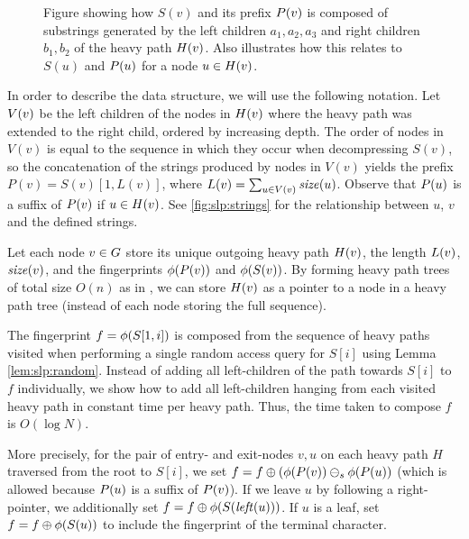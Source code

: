 \begin{figure}[tb]
\begin{center}
\begin{tikzpicture}
\end{tikzpicture}	
	\end{center}
	\caption{Figure showing how $S(v)$ and its prefix $\leftstring(v)$ is composed of substrings generated by the left children $a_1, a_2, a_3$ and right children $b_1, b_2$ of the heavy path $\heavypath(v)$. Also illustrates how this relates to $S(u)$ and $\leftstring(u)$ for a node $u \in \heavypath(v)$.\label{fig:slp:strings}}
\end{figure}

In order to describe the data structure, we will use the following notation. Let $\leftnodes(v)$ be the left children of the nodes in $\heavypath(v)$ where the heavy path was extended to the right child, ordered by increasing depth. The order of nodes in $V(v)$ is equal to the sequence in which they occur when decompressing $S(v)$, so the concatenation of the strings produced by nodes in $V(v)$ yields the prefix $P(v)=S(v)[1,L(v)]$, where $\leftsize(v) = \sum_{u \in \leftnodes(v)} \size(u)$. Observe that $\leftstring(u)$ is a suffix of $\leftstring(v)$ if $u \in \heavypath(v)$. See \autoref{fig:slp:strings} for the relationship between $u$, $v$ and the defined strings.
 
Let each node $v \in \slp$ store its unique outgoing heavy path $\heavypath(v)$, the length $\leftsize(v)$, $\size(v)$, and the fingerprints $\fp(\leftstring(v))$ and $\fp(S(v))$. By forming heavy path trees of total size $O(n)$ as in \cite{bille2011random}, we can store $\heavypath(v)$ as a pointer to a node in a heavy path tree (instead of each node storing the full sequence).

The fingerprint $f = \fp(S[1, i])$ is composed from the sequence of heavy paths visited when performing a single random access query for $S[i]$ using Lemma \ref{lem:slp:random}. Instead of adding all left-children of the path towards $S[i]$ to $f$ individually, we show how to add all left-children hanging from each visited heavy path in constant time per heavy path. Thus, the time taken to compose $f$ is $O(\log N)$. 

More precisely, for the pair of entry- and exit-nodes $v, u$ on each heavy path $H$ traversed from the root to $S[i]$, we set $f = f \fpplus (\fp(\leftstring(v)) \fpdelsuffix \fp(\leftstring(u))$ (which is allowed because $\leftstring(u)$ is a suffix of $\leftstring(v)$). If we leave $u$ by following a right-pointer, we additionally set $f = f \fpplus \fp(S(\lchild(u)))$. If $u$ is a leaf, set $f = f \fpplus \fp(S(u))$ to include the fingerprint of the terminal character. 

